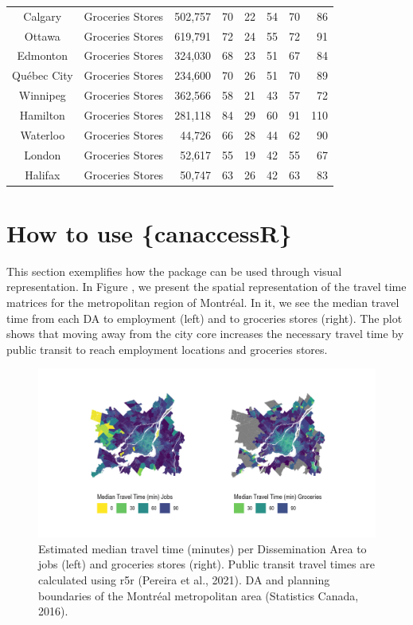 \documentclass[Royal,times,sageh]{sagej}
\begin{document}
\begin{table}[!t]
\begin{tabular*}{1\linewidth}{@{\extracolsep{\fill}}clrrrrrr}
Calgary & Groceries Stores & 502,757 & 70 & 22 & 54 & 70 & 86 \\ 
Ottawa & Groceries Stores & 619,791 & 72 & 24 & 55 & 72 & 91 \\ 
Edmonton & Groceries Stores & 324,030 & 68 & 23 & 51 & 67 & 84 \\ 
Québec City & Groceries Stores & 234,600 & 70 & 26 & 51 & 70 & 89 \\ 
Winnipeg & Groceries Stores & 362,566 & 58 & 21 & 43 & 57 & 72 \\ 
Hamilton & Groceries Stores & 281,118 & 84 & 29 & 60 & 91 & 110 \\ 
Waterloo & Groceries Stores & 44,726 & 66 & 28 & 44 & 62 & 90 \\ 
London & Groceries Stores & 52,617 & 55 & 19 & 42 & 55 & 67 \\ 
Halifax & Groceries Stores & 50,747 & 63 & 26 & 42 & 63 & 83 \\ 
\bottomrule
\end{tabular*}
\end{table}

\section{How to use \{canaccessR\}}\label{how-to-use-canaccessr}

This section exemplifies how the package can be used through visual
representation. In Figure \citet{fig-travel_time_emp_grc_plot}, we
present the spatial representation of the travel time matrices for the
metropolitan region of Montréal. In it, we see the median travel time
from each DA to employment (left) and to groceries stores (right). The
plot shows that moving away from the city core increases the necessary
travel time by public transit to reach employment locations and
groceries stores.

\begin{figure}[H]
\includegraphics[width=1\linewidth]{../figures/patch_tt_emp_grc} \caption{Estimated median travel time (minutes) per Dissemination Area to jobs (left) and groceries stores (right). Public transit travel times are calculated using {r5r} (Pereira et al., 2021). DA and planning boundaries of the Montréal metropolitan area (Statistics Canada, 2016).}\label{fig:fig-travel_time_emp_grc_plot}
\end{figure}
\end{document}
